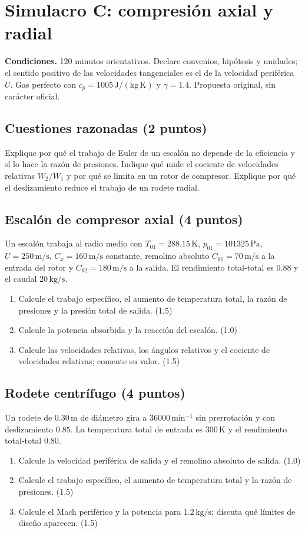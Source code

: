 \chapter{Simulacro C: compresión axial y radial}
\noindent\textbf{Condiciones.} 120 minutos orientativos. Declare convenios, hipótesis y unidades; el sentido positivo de las velocidades tangenciales es el de la velocidad periférica $U$. Gas perfecto con $c_p=1005\,\mathrm{J/(kg\,K)}$ y $\gamma=1.4$. Propuesta original, sin carácter oficial.
\section{Cuestiones razonadas (2 puntos)}
Explique por qué el trabajo de Euler de un escalón no depende de la eficiencia y sí lo hace la razón de presiones. Indique qué mide el cociente de velocidades relativas $W_2/W_1$ y por qué se limita en un rotor de compresor. Explique por qué el deslizamiento reduce el trabajo de un rodete radial.
\section{Escalón de compresor axial (4 puntos)}
Un escalón trabaja al radio medio con $T_{01}=288.15\,\mathrm K$, $p_{01}=101325\,\mathrm{Pa}$, $U=250\,\mathrm{m/s}$, $C_x=160\,\mathrm{m/s}$ constante, remolino absoluto $C_{\theta1}=70\,\mathrm{m/s}$ a la entrada del rotor y $C_{\theta2}=180\,\mathrm{m/s}$ a la salida. El rendimiento total-total es $0.88$ y el caudal $20\,\mathrm{kg/s}$.
\begin{enumerate}[label=\alph*)]
\item Calcule el trabajo específico, el aumento de temperatura total, la razón de presiones y la presión total de salida. (1.5)
\item Calcule la potencia absorbida y la reacción del escalón. (1.0)
\item Calcule las velocidades relativas, los ángulos relativos y el cociente de velocidades relativas; comente su valor. (1.5)
\end{enumerate}
\section{Rodete centrífugo (4 puntos)}
Un rodete de $0.30\,\mathrm m$ de diámetro gira a $36000\,\mathrm{min^{-1}}$ sin prerrotación y con deslizamiento $0.85$. La temperatura total de entrada es $300\,\mathrm K$ y el rendimiento total-total $0.80$.
\begin{enumerate}[label=\alph*)]
\item Calcule la velocidad periférica de salida y el remolino absoluto de salida. (1.0)
\item Calcule el trabajo específico, el aumento de temperatura total y la razón de presiones. (1.5)
\item Calcule el Mach periférico y la potencia para $1.2\,\mathrm{kg/s}$; discuta qué límites de diseño aparecen. (1.5)
\end{enumerate}

